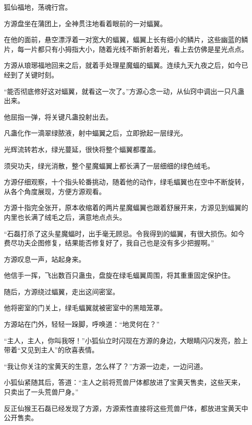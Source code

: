 
\begin{this_body}



狐仙福地，荡魂行宫。

方源盘坐在蒲团上，全神贯注地看着眼前的一对蝠翼。

在他的面前，悬空漂浮着一对宽大的蝠翼，蝠翼上长有细小的鳞片，这些幽蓝的鳞片，每一片都只有小拇指大小，随着光线不断折射着光，看上去仿佛是星光点点。

方源从琅琊福地回来之后，就着手处理星魔蝠的蝠翼。连续九天九夜之后，如今已经到了关键时刻。

“能否彻底修好这对蝠翼，就看这一次了。”方源心念一动，从仙窍中调出一只凡蛊出来。

他屈指一弹，将关键凡蛊投射出去。

凡蛊化作一滴翠绿脓液，射中蝠翼之后，立即掀起一层绿光。

光辉流转若水，绿光蔓延，很快将整个蝠翼都覆盖。

须臾功夫，绿光消散，整个星魔蝠翼上都长满了一层细细的绿色绒毛。

方源仔细观察，十个指头轮番挑动，随着他的动作，绿毛蝠翼也在空中不断旋转，从各个角度展现，方便方源观看。

方源十指完全张开，原本收缩着的两片星魔蝠翼也跟着舒展开来，方源见到蝠翼的内里也长满了绒毛之后，满意地点点头。

“石磊打杀了这头星魔蝠时，出手毫无顾忌。令我得到的蝠翼，有很大损伤。如今费尽功夫企图修复，结果能否修复好了，我自己也是没有多少把握啊。”

方源叹息一声，站起身来。

他信手一挥，飞出数百只蛊虫，盘旋在绿毛蝠翼周围，将其重重固定保护住。

随后，方源绕过蝠翼，走出这间密室。

他将密室的门关上，绿毛蝠翼就被密室中的黑暗笼罩。

方源站在门外，轻轻一跺脚，呼唤道：“地灵何在？”

“主人，主人，你叫我呀！”小狐仙立时闪现在方源的身边，大眼睛闪闪发亮，脸上带着“又见到主人”的欣喜表情。

“我让你关注的宝黄天的生意，怎么样了？”方源一边走，一边问道。

小狐仙紧随其后，答道：“主人之前将荒兽尸体都放进了宝黄天售卖，这些天来，只卖出了一头荒兽尸身。”

反正仙猴王石磊已经发现了方源，方源索性直接将这些荒兽尸体，都放进宝黄天中公开售卖。


\end{this_body}
